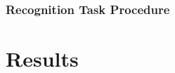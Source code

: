 \documentclass[10pt,letterpaper]{article}
\begin{document}





\subsubsection{Recognition Task Procedure}

\section{Results}
\end{document}
